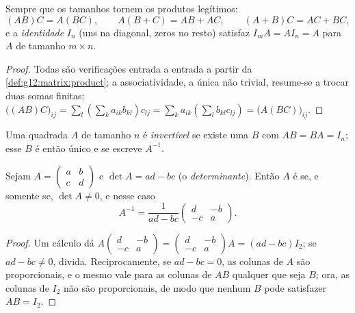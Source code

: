 \begin{proposition}\label{prop:g12:matrix:rules}
Sempre que os tamanhos tornem os produtos legítimos:
\[
(AB)C = A(BC), \qquad A(B + C) = AB + AC, \qquad (A+B)C = AC + BC,
\]
e a \emph{ identidade} $I_n$ (uns na diagonal, zeros no resto)
satisfaz $I_m A = A I_n = A$ para $A$ de tamanho $m \times n$.
\end{proposition}

\begin{proof}
Todas são verificações entrada a entrada a partir da
\cref{def:g12:matrix:product}; a associatividade, a única não trivial,
resume-se a trocar duas somas finitas:
$\bigl((AB)C\bigr)_{ij} = \sum_l \left(\sum_k a_{ik}b_{kl}\right) c_{lj}
= \sum_k a_{ik} \left(\sum_l b_{kl} c_{lj}\right)
= \bigl(A(BC)\bigr)_{ij}$.
\end{proof}

\begin{definition}[Inversa]\label{def:g12:matrix:inverse}
Uma  quadrada $A$ de tamanho $n$ é \emph{invertível}
se existe uma  $B$ com $AB = BA = I_n$; esse $B$ é então único e se
escreve $A^{-1}$.
\end{definition}

\begin{proposition}\label{prop:g12:matrix:inverse2x2}
Sejam $A = \begin{pmatrix} a & b\\ c & d\end{pmatrix}$ e
$\det A = ad - bc$ (o \emph{determinante}). Então $A$ é
 se, e somente se, $\det A \neq 0$, e nesse caso
\[
A^{-1} = \frac{1}{ad - bc}\begin{pmatrix} d & -b\\ -c & a\end{pmatrix}.
\]
\end{proposition}

\begin{proof}
Um cálculo dá
$A \begin{pmatrix} d & -b\\ -c & a\end{pmatrix}
= \begin{pmatrix} d & -b\\ -c & a\end{pmatrix} A = (ad - bc) I_2$; se
$ad - bc \neq 0$, divida. Reciprocamente, se $ad - bc = 0$, as colunas de
$A$ são proporcionais, e o mesmo vale para as colunas de $AB$ qualquer que
seja $B$; ora, as colunas de $I_2$ não são proporcionais, de modo que
nenhum $B$ pode satisfazer $AB = I_2$.
\end{proof}

